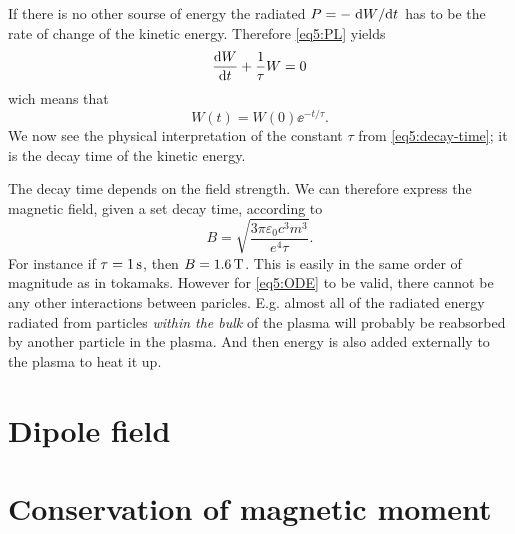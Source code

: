 \documentclass[11pt,a4paper, 
swedish, english %
]{article}
\begin{document}
If there is no other sourse of energy the radiated $P=-\dv*{W}{t}$ has
to be the rate of change of the kinetic energy. Therefore
\eqref{eq5:PL} yields
\begin{equation}\label{eq5:ODE}
\dv{W}{t}+\frac{1}{\tau}W=0
\end{equation}
wich means that
\begin{equation}
W(t)=W(0)\ee^{-t/\tau}.
\end{equation}
We now see the physical interpretation of the constant $\tau$ from
\eqref{eq5:decay-time}; it is the decay time of the kinetic energy.

The decay time depends on the field strength. We can therefore express
the magnetic field, given a set decay time, according to
\begin{equation}
B=\sqrt{\frac{3\pi \varepsilon_0 c^3m^3}{e^4\tau}}.
\end{equation}
For instance if $\tau=\unit[1]{s}$, then $B=\unit[1.6]{T}$. This is
easily in the same order of magnitude as in tokamaks. However for  
\eqref{eq5:ODE} to be valid, there cannot be any other interactions
between paricles. E.g. almost all of the radiated energy radiated from
particles \emph{within the bulk} of the plasma will probably be
reabsorbed by another particle in the plasma. And then energy is also
added externally to the plasma to heat it up.


\section{Dipole field}


\section{Conservation of magnetic moment}




\end{document}
